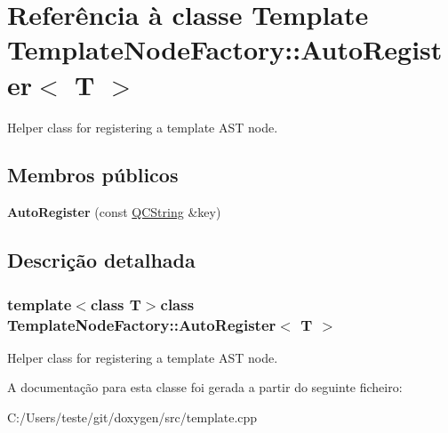 \hypertarget{class_template_node_factory_1_1_auto_register}{\section{Referência à classe Template Template\-Node\-Factory\-:\-:Auto\-Register$<$ T $>$}
\label{class_template_node_factory_1_1_auto_register}
}


Helper class for registering a template A\-S\-T node.  


\subsection*{Membros públicos}
\begin{DoxyCompactItemize}
\item 
\hypertarget{class_template_node_factory_1_1_auto_register_acebfd9126d99a204c06188d4a3b405fe}{{\bfseries Auto\-Register} (const \hyperlink{class_q_c_string}{Q\-C\-String} \&key)}\label{class_template_node_factory_1_1_auto_register_acebfd9126d99a204c06188d4a3b405fe}

\end{DoxyCompactItemize}


\subsection{Descrição detalhada}
\subsubsection*{template$<$class T$>$class Template\-Node\-Factory\-::\-Auto\-Register$<$ T $>$}

Helper class for registering a template A\-S\-T node. 

A documentação para esta classe foi gerada a partir do seguinte ficheiro\-:\begin{DoxyCompactItemize}
\item 
C\-:/\-Users/teste/git/doxygen/src/template.\-cpp\end{DoxyCompactItemize}
